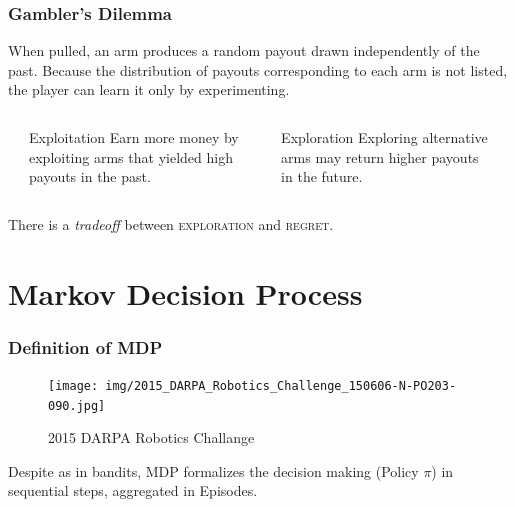 \documentclass[aspectratio=169]{beamer}
\begin{document}
\begin{frame}
\frametitle{Gambler's Dilemma}
When pulled, an arm produces a random payout drawn independently of the past. Because the distribution of payouts corresponding to each arm is not listed, the player can learn it only by experimenting.
	\begin{columns}
		\begin{column}{0.1\textwidth}\end{column}
		\begin{column}{0.4\textwidth}
			\begin{alertblock}{Exploitation}
		Earn more money by exploiting arms that yielded high payouts in the past.
			\end{alertblock}
		\end{column}
		\begin{column}{0.4\textwidth}  %
			\begin{alertblock}{Exploration}
		Exploring alternative arms may return higher payouts in the future.
			\end{alertblock}
		\end{column}
		\begin{column}{0.1\textwidth}\end{column}
	\end{columns}
	There is a \textit{tradeoff} between \textsc{exploration} and \textsc{regret}.
\end{frame}

\section{Markov Decision Process}
\begin{frame}
	\frametitle{Definition of MDP}
	\begin{figure}
		\texttt{[image: img/2015\_DARPA\_Robotics\_Challenge\_150606-N-PO203-090.jpg]}	
		\caption{2015 DARPA Robotics Challange \cite{mdp-robot}}
	\end{figure}
	Despite as in bandits, MDP formalizes the decision making (Policy $\pi$) in sequential steps, aggregated in Episodes. 
\end{frame}
\end{document}
